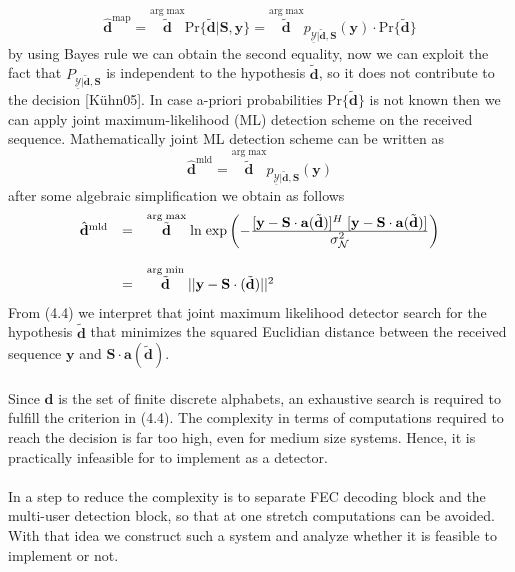 \begin{equation}
\mathrm{\hat{\mathbf{d}}^{map}}=\stackrel{\mathrm{arg\;max}}{\mathrm{\tilde{\mathbf{d}}}} \mathrm{Pr}\{\mathrm{\tilde{\mathbf{d}}}\vert \mathrm{\mathbf{S}},\mathrm{\mathbf{y}}\} = \stackrel{\mathrm{arg\;max}}{\mathrm{\tilde{\mathbf{d}}}} p_{\underline{\mathcal{Y}}\vert\mathrm{\tilde{\mathbf{d}}},\mathrm{\mathbf{S}}}(\mathrm{\mathbf{y}})\cdot \mathrm{Pr}\{\mathrm{\tilde{\mathbf{d}}}\}
\end{equation}
by using Bayes rule we can obtain the second equality, now we can exploit the fact that $P_{\underline{\mathcal{Y}}\vert \mathrm{\tilde{\mathbf{d}}},\mathrm{\mathbf{S}}}$ is independent to the hypothesis $\mathrm{\tilde{\mathbf{d}}}$, so it does not contribute to the decision [K\"uhn05]. In case a-priori probabilities $\mathrm{Pr\{\tilde{\mathbf{d}}\}}$ is not known then we can apply joint maximum-likelihood (ML) detection scheme on the received sequence. Mathematically joint ML detection scheme can be written as
\begin{equation}
\mathrm{\hat{\mathbf{d}}^{mld}}=\stackrel{\mathrm{arg\;max}}{\mathrm{\tilde{\mathbf{d}}}}p_{\underline{\mathcal{Y}}\vert\mathrm{\tilde{\mathbf{d}}},\mathrm{\mathbf{S}}}(\mathrm{\mathbf{y}})
\end{equation}
after some algebraic simplification we obtain as follows
\begin{eqnarray}
\begin{array}{lll}
\mathrm{\hat{\mathbf{d}}^{mld}}&=&\stackrel{\mathrm{arg\;max}}{\mathrm{\tilde{\mathbf{d}}}} \mathrm{ln\;exp}\left(-\frac{\hbox{$[\mathrm{\mathbf{y}}-\mathrm{\mathbf{S}}\cdot \mathrm{\mathbf{a}}(\mathrm{\tilde{\mathbf{d}}})]^{H}\;[\mathrm{\mathbf{y}}-\mathrm{\mathbf{S}}\cdot \mathrm{\mathbf{a}}(\mathrm{\tilde{\mathbf{d}}})]$}} {\hbox{$\sigma^2_{\mathcal{N}}$}}\right) \\ \\

&=&\stackrel{\mathrm{arg\;min}}{\mathrm{\tilde{\mathbf{d}}}}\vert \vert \mathrm{\mathbf{y}}-\mathrm{\mathbf{S}}\cdot\mathrm{(\tilde{\mathbf{d}})}\vert\vert^2
\end{array}
\end{eqnarray}
From (4.4) we interpret that joint maximum likelihood detector search for the hypothesis $\mathrm{\tilde{\mathbf{d}}}$ that minimizes the squared Euclidian distance between the received sequence $\mathrm{\mathbf{y}}$ and $\mathrm{\mathbf{S\cdot a(\tilde{d})}}$. \\ \\
Since $\mathrm{\mathbf{d}}$ is the set of finite discrete alphabets, an exhaustive search is required to fulfill the criterion in (4.4). The complexity in terms of computations required to reach the decision is far too high, even for medium size systems. Hence, it is practically infeasible for to implement as a detector. \\ \\
In a step to reduce the complexity is to separate FEC decoding block and the multi-user detection block, so that at one stretch computations can be avoided. With that idea we construct such a system and analyze whether it is feasible to implement or not.
